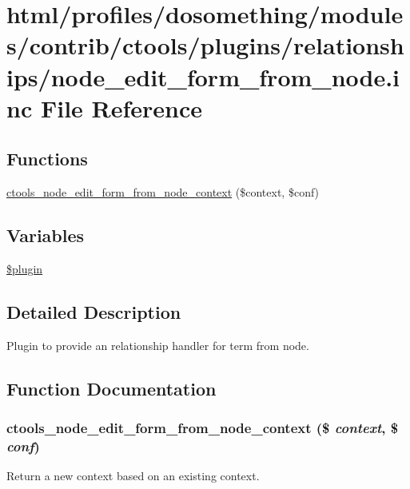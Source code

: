 \hypertarget{node__edit__form__from__node_8inc}{
\section{html/profiles/dosomething/modules/contrib/ctools/plugins/relationships/node\_\-edit\_\-form\_\-from\_\-node.inc File Reference}
\label{node__edit__form__from__node_8inc}
}
\subsection*{Functions}
\begin{DoxyCompactItemize}
\item 
\hyperlink{node__edit__form__from__node_8inc_aceecf0b8bb0bd0d5768dec0351d9efc2}{ctools\_\-node\_\-edit\_\-form\_\-from\_\-node\_\-context} (\$context, \$conf)
\end{DoxyCompactItemize}
\subsection*{Variables}
\begin{DoxyCompactItemize}
\item 
\hyperlink{node__edit__form__from__node_8inc_ada8a7130088351710bb02ed622d6bf65}{\$plugin}
\end{DoxyCompactItemize}


\subsection{Detailed Description}
Plugin to provide an relationship handler for term from node. 

\subsection{Function Documentation}
\hypertarget{node__edit__form__from__node_8inc_aceecf0b8bb0bd0d5768dec0351d9efc2}{
\subsubsection[{ctools\_\-node\_\-edit\_\-form\_\-from\_\-node\_\-context}]{\setlength{\rightskip}{0pt plus 5cm}ctools\_\-node\_\-edit\_\-form\_\-from\_\-node\_\-context (\$ {\em context}, \/  \$ {\em conf})}}
\label{node__edit__form__from__node_8inc_aceecf0b8bb0bd0d5768dec0351d9efc2}
Return a new context based on an existing context. 

